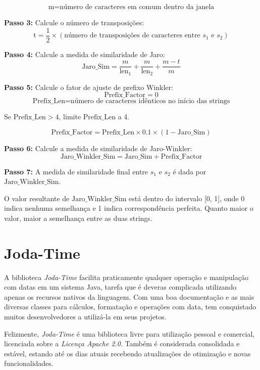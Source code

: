 \documentclass[
	12pt,			%
	openright,		%
	oneside,	
	a4paper,		%
	english,		%
	brazil			%
]{abntex2/abntex2}  %
\begin{document}
			\[
			\text{m} = \text{número de caracteres em comum dentro da janela}
			\]
			
			\noindent
			\textbf{Passo 3:} Calcule o número de transposições:
			\[
			\text{t} = \frac{1}{2} \times \left(\text{número de transposições de caracteres entre $s_1$ e $s_2$}\right)
			\]
			
			\noindent
			\textbf{Passo 4:} Calcule a medida de similaridade de Jaro:
			\[
			\text{Jaro\_Sim} = \frac{m}{\text{len}_1} + \frac{m}{\text{len}_2} + \frac{m - t}{m}
			\]
			
			\noindent
			\textbf{Passo 5:} Calcule o fator de ajuste de prefixo Winkler:
			\[
			\text{Prefix\_Factor} = 0
			\]
			\[
			\text{Prefix\_Len} = \text{número de caracteres idênticos no início das strings}
			\]
			
			Se $\text{Prefix\_Len} > 4$, limite $\text{Prefix\_Len}$ a 4.
			
			\[
			\text{Prefix\_Factor} = \text{Prefix\_Len} \times 0.1 \times (1 - \text{Jaro\_Sim})
			\]
			
			\noindent
			\textbf{Passo 6:} Calcule a medida de similaridade de Jaro-Winkler:
			\[
			\text{Jaro\_Winkler\_Sim} = \text{Jaro\_Sim} + \text{Prefix\_Factor}
			\]
			
			\noindent
			\textbf{Passo 7:} A medida de similaridade final entre $s_1$ e $s_2$ é dada por $\text{Jaro\_Winkler\_Sim}$.
			
			O valor resultante de $\text{Jaro\_Winkler\_Sim}$ está dentro do intervalo [0, 1], onde 0 indica nenhuma semelhança e 1 indica correspondência perfeita. Quanto maior o valor, maior a semelhança entre as duas strings.
			
		\section{Joda-Time} \label{joda-time}
			
			A biblioteca \textit{Joda-Time} \cite{joda-time} facilita praticamente qualquer operação e manipulação com datas em um sistema Java, tarefa que é deveras complicada utilizando apenas os recursos nativos da linguagem. Com uma boa documentação e as mais diversas classes para cálculos, formatação e operações com data, tem conquistado muitos desenvolvedores a utilizá-la em seus projetos.
			
			Felizmente, \textit{Joda-Time} é uma biblioteca livre para utilização pessoal e comercial, licenciada sobre a \textit{Licença Apache 2.0}. Também é considerada consolidada e estável, estando até os dias atuais recebendo atualizações de otimização e novas funcionalidades.
\end{document}
